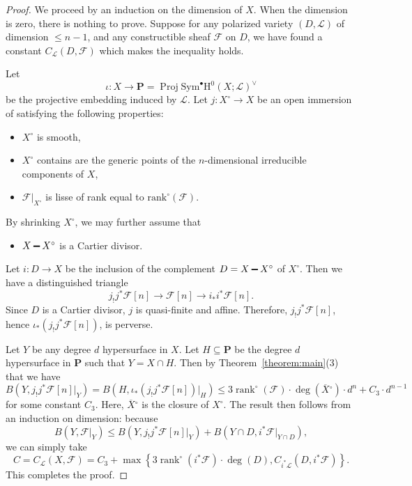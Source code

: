 \documentclass[10pt,a4paper]{amsart}
\renewcommand{\leq}{\leqslant}
\renewcommand{\mathbb}{\mathbf}
\renewcommand{\setminus}{\mathbin{\rule[0.2em]{0.67em}{0.12em}}}%
\renewcommand{\subset}{\subseteq}
\begin{document}
\begin{proof}
We proceed by an induction on the dimension of \(X\).  When the
dimension is zero, there is nothing to prove.  Suppose for any polarized variety
\((D,\mathscr{L})\) of dimension \(\leq n-1\), and any constructible sheaf \(\mathcal{F}\)
on \(D\), we have found a constant \(C_{\mathscr{L}}(D,\mathcal{F})\) which makes
the inequality holds.

Let
\[
\iota\colon X \to \mathbb{P} = \operatorname{Proj}\mathrm{Sym}^{\bullet}\mathrm{H}^0(X;\mathscr{L})^{\vee}
\]
be the projective embedding induced by \(\mathscr{L}\).  Let
\(j\colon X^{\circ} \to X\) be an open immersion of satisfying the
following properties:
\begin{itemize}
\item \(X^{\circ}\) is smooth,
\item \(X^{\circ}\) contains are the generic points of the
\(n\)-dimensional irreducible components of \(X\),
\item \(\mathcal{F}|_{X^{\circ}}\) is lisse of rank equal to
\(\mathrm{rank}^{\circ}(\mathcal{F})\).
\end{itemize}
By shrinking \(X^{\circ}\), we may further assume that
\begin{itemize}
\item \(X \setminus X^{\circ}\) is a Cartier divisor.
\end{itemize}
Let \(i \colon D \to X\) be the inclusion of
the complement \(D = X \setminus X^{\circ}\) of \(X^{\circ}\).  Then
we have a distinguished triangle
\[
j_! j^{\ast}\mathcal{F}[n] \to \mathcal{F}[n] \to i_{\ast} i^{\ast} \mathcal{F}[n].
\]
Since \(D\) is a Cartier divisor, \(j\) is quasi-finite and affine.
Therefore, \(j_!j^{\ast}\mathcal{F}[n]\), hence \(\iota_{\ast} (j_!j^{\ast}\mathcal{F}[n])\), is perverse.

Let \(Y\) be any degree \(d\) hypersurface in \(X\).
Let \(H \subset \mathbb{P}\) be the degree \(d\) hypersurface in \(\mathbb{P}\) such that \(Y = X \cap H\).
Then by
Theorem~\ref{theorem:main}(3) that we have
\[
B(Y, j_!j^{\ast}\mathcal{F}[n]|_Y) = B(H, \iota_{\ast} (j_!j^{\ast}\mathcal{F}[n])|_{H})
\leq 3\operatorname{rank}^{\circ}(\mathcal{F}) \cdot \deg(\overline{X}{}^{\circ})
\cdot d^n + C_3 \cdot d^{n-1}
\]
for some constant \(C_3\).  Here, \(\overline{X}{}^{\circ}\) is the
closure of \(X^{\circ}\).  The result then follows from an induction
on dimension: because
\[
B(Y, \mathcal{F}|_{Y}) \leq B(Y, j_!j^{\ast}\mathcal{F}[n]|_Y) + B(Y \cap D, i^{\ast} \mathcal{F}|_{Y\cap D}),
\]
we can simply take
\[
C = C_{\mathscr{L}}(X,\mathcal{F})=C_{3} + \max\left\{3\operatorname{rank}^{\circ}(i^{\ast}\mathcal{F})\cdot \deg(D), C_{i^{\ast}\mathscr{L}}(D,i^{\ast}\mathcal{F})\right\}.
\]
This completes the proof.
\end{proof}
\end{document}
